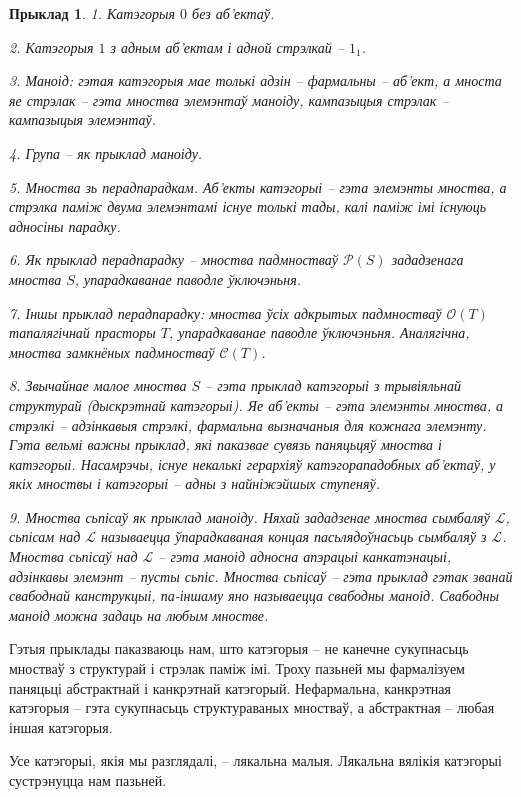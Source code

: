 \documentclass[a4paper,12pt]{book}
\newtheorem{example}{Прыклад}[section]
\begin{document}
\begin{example}
  1. Катэгорыя $0$ без аб'ектаў.

  2. Катэгорыя $1$ з адным аб'ектам і адной стрэлкай -- $1_1$.

  3. Маноід: гэтая катэгорыя мае
  толькі адзін -- фармальны -- аб'ект, а мноста яе стрэлак -- гэта
  мноства элемэнтаў маноіду, кампазыцыя стрэлак -- кампазыцыя
  элемэнтаў.

  4. Група -- як прыклад маноіду.

  5. Мноства зь перадпарадкам. Аб'екты катэгорыі -- гэта
  элемэнты мноства, а стрэлка паміж двума элемэнтамі існуе толькі
  тады, калі паміж імі існуюць адносіны парадку.

  6. Як прыклад перадпарадку -- мноства падмностваў $\mathcal{P}(S)$
  зададзенага
  мноства $S$, упарадкаванае паводле ўключэньня.

  7. Іншы прыклад перадпарадку: мноства ўсіх адкрытых падмностваў
  $\mathcal{O}(T)$ тапалягічнай прасторы $T$, упарадкаванае паводле
  ўключэньня. Аналягічна, мноства замкнёных падмностваў
  $\mathcal{C}(T)$.

  8. Звычайнае малое мноства $S$ -- гэта прыклад катэгорыі з трывіяльнай
  структурай (дыскрэтнай катэгорыі). Яе аб'екты -- гэта элемэнты
  мноства, а стрэлкі -- адзінкавыя стрэлкі, фармальна вызначаныя для
  кожнага элемэнту. Гэта вельмі важны прыклад, які паказвае сувязь
  паняцьцяў мноства і катэгорыі. Насамрэчы, існуе некалькі герархіяў
  катэгорападобных аб'ектаў, у якіх мноствы і катэгорыі -- адны з
  найніжэйшых ступеняў.

  9. Мноства сьпісаў як прыклад маноіду. Няхай зададзенае мноства
  сымбаляў
  $\mathcal{L}$, сьпісам над $\mathcal{L}$ называецца ўпарадкаваная
  концая пасьлядоўнасьць сымбаляў з $\mathcal{L}$. Мноства сьпісаў над
  $\mathcal{L}$ -- гэта
  маноід адносна апэрацыі канкатэнацыі, адзінкавы элемэнт -- пусты
  сьпіс. Мноства сьпісаў -- гэта прыклад гэтак званай свабоднай
  канструкцыі, па-іншаму яно называецца свабодны маноід. Свабодны
  маноід можна задаць на любым мностве.
\end{example}

Гэтыя прыклады паказваюць нам, што катэгорыя -- не канечне сукупнасьць
мностваў з структурай і стрэлак паміж імі. Троху пазьней мы
фармалізуем паняцьці абстрактнай і канкрэтнай катэгорый. Нефармальна,
канкрэтная катэгорыя -- гэта сукупнасьць структураваных мностваў, а
абстрактная -- любая іншая катэгорыя.

Усе катэгорыі, якія мы разглядалі, -- лякальна малыя. Лякальна вялікія
катэгорыі сустрэнуцца нам пазьней.
\end{document}
